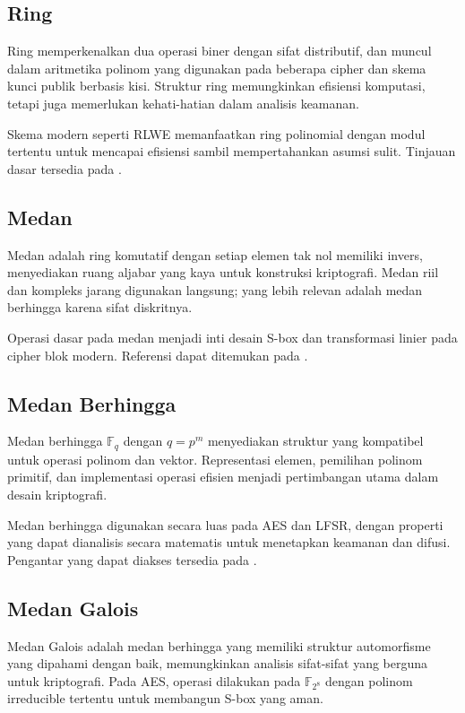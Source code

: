 \documentclass[../main.tex]{subfiles}
\begin{document}
\subsection{Ring}
Ring memperkenalkan dua operasi biner dengan sifat distributif, dan muncul dalam aritmetika polinom yang digunakan pada beberapa cipher dan skema kunci publik berbasis kisi. Struktur ring memungkinkan efisiensi komputasi, tetapi juga memerlukan kehati-hatian dalam analisis keamanan.

Skema modern seperti RLWE memanfaatkan ring polinomial dengan modul tertentu untuk mencapai efisiensi sambil mempertahankan asumsi sulit. Tinjauan dasar tersedia pada \textcite{menezes1996handbook}.

\subsection{Medan}
Medan adalah ring komutatif dengan setiap elemen tak nol memiliki invers, menyediakan ruang aljabar yang kaya untuk konstruksi kriptografi. Medan riil dan kompleks jarang digunakan langsung; yang lebih relevan adalah medan berhingga karena sifat diskritnya.

Operasi dasar pada medan menjadi inti desain S-box dan transformasi linier pada cipher blok modern. Referensi dapat ditemukan pada \textcite{menezes1996handbook}.

\subsection{Medan Berhingga}
Medan berhingga \(\mathbb{F}_q\) dengan \(q=p^m\) menyediakan struktur yang kompatibel untuk operasi polinom dan vektor. Representasi elemen, pemilihan polinom primitif, dan implementasi operasi efisien menjadi pertimbangan utama dalam desain kriptografi.

Medan berhingga digunakan secara luas pada AES dan LFSR, dengan properti yang dapat dianalisis secara matematis untuk menetapkan keamanan dan difusi. Pengantar yang dapat diakses tersedia pada \textcite{menezes1996handbook}.

\subsection{Medan Galois}
Medan Galois adalah medan berhingga yang memiliki struktur automorfisme yang dipahami dengan baik, memungkinkan analisis sifat-sifat yang berguna untuk kriptografi. Pada AES, operasi dilakukan pada \(\mathbb{F}_{2^8}\) dengan polinom irreducible tertentu untuk membangun S-box yang aman.
\end{document}
